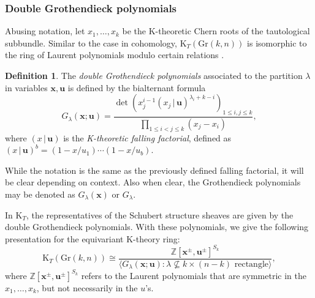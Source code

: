 \documentclass[12pt]{article}
\newcommand{\bb}[1]{\mathbb{#1}}
\theoremstyle{plain}
\theoremstyle{definition}
\newtheorem{definition}[theorem]{Definition}
\newcommand{\xb}{\boldsymbol{x}}
\newcommand{\ub}{\boldsymbol{u}}
\begin{document}
\subsubsection{Double Grothendieck polynomials}
Abusing notation, let $x_1,\dots,x_k$ be the K-theoretic Chern roots of the tautological subbundle. Similar to the case in cohomology, $\textrm{K}_T(\textrm{Gr}(k,n))$ is isomorphic to the ring of Laurent polynomials modulo certain relations \cite{cotti2024satakecorrespondenceequivariantquantum}. 
\begin{definition}
The \textit{double Grothendieck polynomials} associated to the partition $\lambda$ in variables $\xb,\ub$ is defined by the bialternant formula 
\begin{equation} \label{gdetformula}
    G_{\lambda} (\xb;\ub) = \frac{\det \left(x_j ^{i-1} (x_j \,|\, \ub) ^{\lambda_i +k -i} \right)_{1\leq i,j \leq k}}{\prod_{1\leq i<j\leq k }(x_j -x_i)},
\end{equation}
where $(x\, | \,\ub)$ is the \emph{K-theoretic falling factorial}, defined as $(x \,|\, \ub)^b = (1-x/u_1)\cdots(1-x/u_b).$
\end{definition}
While the notation is the same as the previously defined falling factorial, it will be clear depending on context. Also when clear, the Grothendieck polynomials may be denoted as $G_\lambda (\xb)$ or $G_\lambda$.


In $\mathrm{K}_T$, the representatives of the Schubert structure sheaves are given by the double Grothendieck polynomials. With these polynomials, we give the following presentation for the equivariant K-theory ring:
\begin{equation}
    \textrm{K}_T(\textrm{Gr}(k,n)) \cong \frac{\bb{Z}[\xb^\pm,\ub^\pm]^{S_k}}{\langle G_\lambda(\xb;\ub) : \lambda \not \subseteq k \times (n-k) \text{ rectangle} \rangle},
\end{equation}
where $\bb{Z}[\xb^\pm, \ub^\pm] ^{S_k}$ refers to the Laurent polynomials that are symmetric in the $x_1,\dots,x_k$, but not necessarily in the $u$'s.
\end{document}
